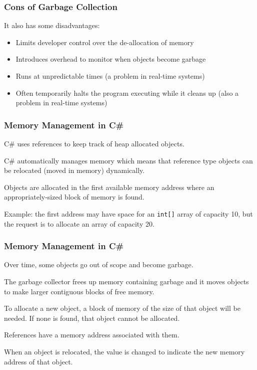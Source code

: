 \begin{frame}
\frametitle{Cons of Garbage Collection}

It also has some disadvantages:
\begin{itemize}
	\item Limits developer control over the de-allocation of memory
	\item Introduces overhead to monitor when objects become garbage
	\item Runs at unpredictable times (a problem in real-time systems)
	\item Often temporarily halts the program executing while it cleans up (also a problem in real-time systems)
\end{itemize}
\end{frame}

\begin{frame}
\frametitle{Memory Management in C\#}

C\# uses references to keep track of heap allocated objects.

C\# automatically manages memory which means that reference type objects can be relocated (moved in memory) dynamically.

Objects are allocated in the first available memory address where an appropriately-sized block of memory is found.

Example: the first address may have space for an \texttt{int[]} array of capacity 10, but the request is to allocate an array of capacity 20.

\end{frame}

\begin{frame}
\frametitle{Memory Management in C\#}

Over time, some objects go out of scope and become garbage.

The garbage collector frees up memory containing garbage and it moves objects to make larger contiguous blocks of free memory.

To allocate a new object, a block of memory of the size of that object will be needed. If none is found, that object cannot be allocated.

References have a memory address associated with them.

When an object is relocated, the value is changed to indicate the new memory address of that object.

\end{frame}

